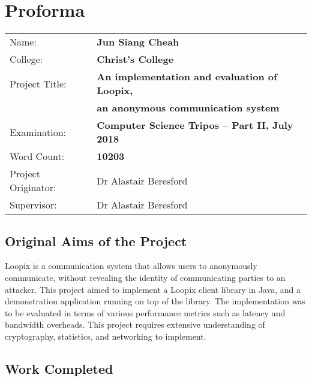 \documentclass[final,dissertation.tex]{subfiles}
\begin{document}
\pagestyle{plain}

\chapter*{Proforma}

{\large
	\begin{tabular}{ll}
		Name:               & \bf Jun Siang Cheah                               \\
		College:            & \bf Christ's College                              \\
		Project Title:      & \bf An implementation and evaluation of Loopix,   \\ 
		& \bf an anonymous communication system                                 \\
		Examination:        & \bf Computer Science Tripos -- Part II, July 2018 \\
		Word Count:         & \bf 10203\footnotemark                              \\
		Project Originator: & Dr Alastair Beresford                             \\
		Supervisor:         & Dr Alastair Beresford                             \\ 
	\end{tabular}
}


\section*{Original Aims of the Project}


Loopix is a communication system that allows users to anonymously communicate, without revealing the identity of communicating parties to an attacker. This project aimed to implement a Loopix client library in Java, and a demonstration application running on top of the library. The implementation was to be evaluated in terms of various performance metrics such as latency and bandwidth overheads. This project requires extensive understanding of cryptography, statistics, and networking to implement.

\section*{Work Completed}
\end{document}
